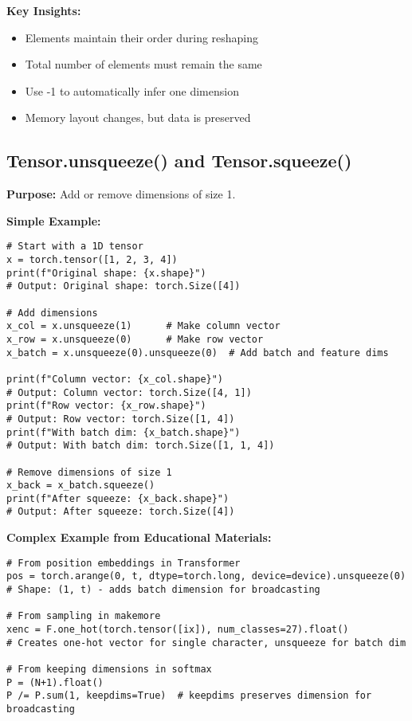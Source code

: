 \documentclass[11pt,a4paper]{book}
\begin{document}
\textbf{Key Insights:}
\begin{itemize}
    \item Elements maintain their order during reshaping
    \item Total number of elements must remain the same
    \item Use -1 to automatically infer one dimension
    \item Memory layout changes, but data is preserved
\end{itemize}

\subsection{Tensor.unsqueeze() and Tensor.squeeze()}

\textbf{Purpose:} Add or remove dimensions of size 1.

\textbf{Simple Example:}
\begin{verbatim}
# Start with a 1D tensor
x = torch.tensor([1, 2, 3, 4])
print(f"Original shape: {x.shape}")
# Output: Original shape: torch.Size([4])

# Add dimensions
x_col = x.unsqueeze(1)      # Make column vector
x_row = x.unsqueeze(0)      # Make row vector
x_batch = x.unsqueeze(0).unsqueeze(0)  # Add batch and feature dims

print(f"Column vector: {x_col.shape}")
# Output: Column vector: torch.Size([4, 1])
print(f"Row vector: {x_row.shape}")
# Output: Row vector: torch.Size([1, 4])
print(f"With batch dim: {x_batch.shape}")
# Output: With batch dim: torch.Size([1, 1, 4])

# Remove dimensions of size 1
x_back = x_batch.squeeze()
print(f"After squeeze: {x_back.shape}")
# Output: After squeeze: torch.Size([4])
\end{verbatim}

\textbf{Complex Example from Educational Materials:}
\begin{verbatim}
# From position embeddings in Transformer
pos = torch.arange(0, t, dtype=torch.long, device=device).unsqueeze(0)
# Shape: (1, t) - adds batch dimension for broadcasting

# From sampling in makemore
xenc = F.one_hot(torch.tensor([ix]), num_classes=27).float()
# Creates one-hot vector for single character, unsqueeze for batch dim

# From keeping dimensions in softmax
P = (N+1).float()
P /= P.sum(1, keepdims=True)  # keepdims preserves dimension for broadcasting
\end{verbatim}
\end{document}
